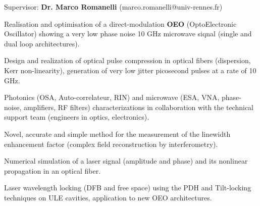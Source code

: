\documentclass[9pt,a4paper,academicons]{altacv}
\begin{document}

\begin{fullwidth}
  \makecvheader
\end{fullwidth}






Supervisor: \textbf{Dr. Marco Romanelli} (marco.romanelli@univ-rennes.fr)

\begin{cvlistdescription}
    \item Realisation and optimisation of a direct-modulation \textbf{OEO} (OptoElectronic Oscillator) showing a very low phase noise 10 GHz microwave siqnal (single and dual loop architectures).

    \item Design and realization of optical pulse compression in optical fibers (dispersion, Kerr non-linearity), generation of very low jitter picosecond pulses at a rate of 10 GHz.
    \item Photonics (OSA, Auto-correlateur, RIN) and microwave (ESA, VNA, phase-noise, amplifiers, RF filters) characterizations in collaboration with the technical support team (engineers in optics, electronics).
    \item Novel, accurate and simple method for the measurement of the linewidth enhancement factor (complex field reconstruction by interferometry).
    \item Numerical simulation of a laser signal (amplitude and phase) and its nonlinear propagation in an optical fiber.
    \item Laser wavelength locking (DFB and free space) using the PDH and Tilt-locking techniques on ULE cavities, application to new OEO architectures.
\end{cvlistdescription}
\end{document}
